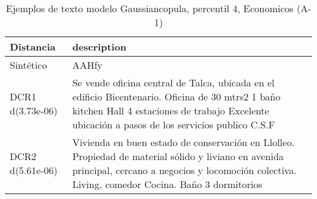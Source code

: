 \begin{table}[H]
\centering
\fontsize{10}{14}\selectfont
\caption{Ejemplos de texto modelo Gaussiancopula, percentil 4, Economicos (A-1)}
\label{table-example-economicos-a-1-gaussiancopula-4p-text}
\begin{tabular}{|l|m{35em}|}
\hline
\rowcolor[gray]{0.8}
Distancia & description \\
\hline Sintético & AAHfy \\
\hline DCR1 d(3.73e-06) & Se vende oficina central de Talca, ubicada en el edificio Bicentenario.  Oficina de 30 mtrs2 1 ba\~no kitchen Hall 4 estaciones de trabajo  Excelente ubicaci\'on a pasos de los servicios publico  C.S.F \\
\hline DCR2 d(5.61e-06) & Vivienda en buen estado de conservaci\'on en Llolleo. Propiedad de material s\'olido y liviano en avenida principal, cercano a negocios y locomoci\'on colectiva.    Living, comedor    Cocina.   Ba\~no   3 dormitorios \\
\hline
\end{tabular}
\end{table}
